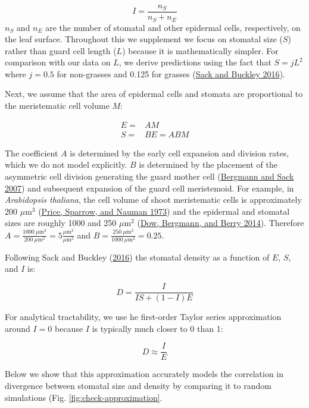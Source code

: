 \documentclass[
  12pt,
]{article}
\begin{document}
\[I = \frac{n_S}{n_S + n_E}\]
\(n_S\) and \(n_E\) are the number of stomatal and other epidermal cells, respectively, on the leaf surface. Throughout this we supplement we focus on stomatal size (\(S\)) rather than guard cell length (\(L\)) because it is mathematically simpler. For comparison with our data on \(L\), we derive predictions using the fact that \(S = j L^2\) where \(j=0.5\) for non-grasses and 0.125 for grasses (\protect\hyperlink{ref-sack_developmental_2016}{Sack and Buckley 2016}).

Next, we assume that the area of epidermal cells and stomata are proportional to the meristematic cell volume \(M\):

\begin{align}
  E = & A M \\
  S = & B E = A B M
  \label{eq:eq1}
\end{align}

The coefficient \(A\) is determined by the early cell expansion and division rates, which we do not model explicitly. \(B\) is determined by the placement of the asymmetric cell division generating the guard mother cell (\protect\hyperlink{ref-bergmann_stomatal_2007}{Bergmann and Sack 2007}) and subsequent expansion of the guard cell meristemoid. For example, in \emph{Arabidopsis thaliana}, the cell volume of shoot meristematic cells is approximately 200 \(\mu\textrm{m}^3\) (\protect\hyperlink{ref-price_correlations_1973}{Price, Sparrow, and Nauman 1973}) and the epidermal and stomatal sizes are roughly 1000 and 250 \(\mu\textrm{m}^2\) (\protect\hyperlink{ref-dow_integrated_2014}{Dow, Bergmann, and Berry 2014}). Therefore \(A = \frac{1000~\mu\textrm{m}^3}{200 ~\mu\textrm{m}^2} = 5 \frac{\mu\textrm{m}^3}{\mu\textrm{m}^2}\) and \(B = \frac{250~\mu\textrm{m}^3}{1000 ~\mu\textrm{m}^2} = 0.25\).

Following Sack and Buckley (\protect\hyperlink{ref-sack_developmental_2016}{2016}) the stomatal density as a function of \(E\), \(S\), and \(I\) is:

\[D = \frac{I}{IS + (1 - I) E}\]

For analytical tractability, we use he first-order Taylor series approximation around \(I = 0\) because \(I\) is typically much closer to 0 than 1:

\[D \approx \frac{I}{E}\]

Below we show that this approximation accurately models the correlation in divergence between stomatal size and density by comparing it to random simulations (Fig. \ref{fig:check-approximation}.
\end{document}
